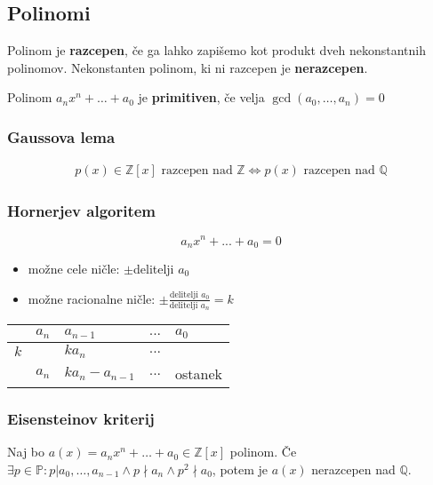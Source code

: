 	\subsection*{Polinomi}
	Polinom je \textbf{razcepen}, če ga lahko zapišemo kot produkt dveh nekonstantnih polinomov.
	Nekonstanten polinom, ki ni razcepen je \textbf{nerazcepen}.

	Polinom $a_n x^n + \dots + a_0$ je \textbf{primitiven}, če velja $\gcd(a_0, \dots, a_n) = 0$

	\subsubsection*{Gaussova lema}
	\begin{align*}
		p(x) \in \mathbb{Z}[x] \text{ razcepen nad } \mathbb{Z} \iff p(x) \text{ razcepen nad } \mathbb{Q}
	\end{align*}

	\subsubsection*{Hornerjev algoritem}
	\[a_n x^n + ... + a_0 = 0\]
	\begin{itemize}
		\item možne cele ničle: $\pm$delitelji $a_0$
		\item možne racionalne ničle: $\pm \frac{\text{delitelji }a_0}{\text{delitelji }a_n} = k$
	\end{itemize}
	\begin{center}
		\begin{tabular}{ l|l l l l}
				& $a_n$ & $a_{n-1}$ & $...$ & $a_0$ \\ \hline
			$k$ &       & $ka_n$    & $...$ & \\ \hline
				& $a_n$ & $ka_n - a_{n-1}$ & $...$ & ostanek\\
		\end{tabular}
	\end{center}

	\subsubsection*{Eisensteinov kriterij}
	Naj bo $a(x) = a_n x^n + \dots + a_0 \in \mathbb{Z}[x]$ polinom. Če $\exists p \in \mathbb{P} : p | a_0, \dots, a_{n-1} \wedge p \nmid a_n \wedge p^2 \nmid a_0$, potem je $a(x)$ nerazcepen nad $\mathbb{Q}$.

